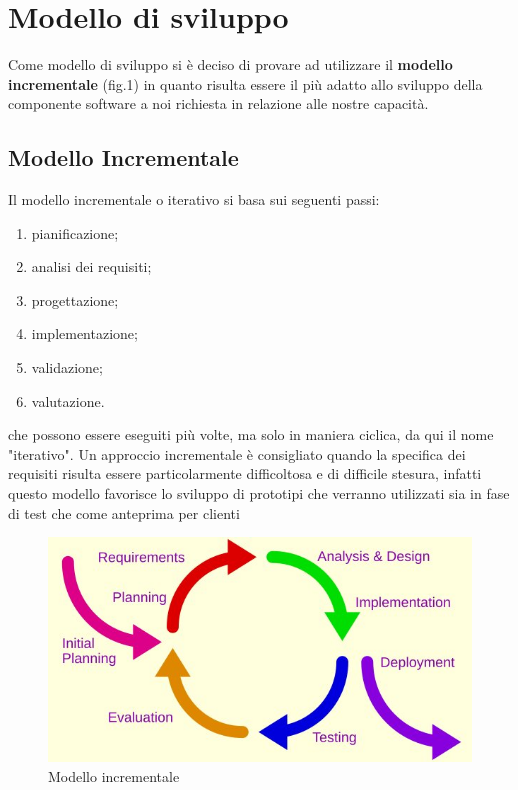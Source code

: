 \section{Modello di sviluppo}
	Come modello di sviluppo si è deciso di provare ad utilizzare il \textbf{modello incrementale} (fig.1) in quanto risulta essere il più adatto allo sviluppo della componente software a noi richiesta in relazione alle nostre capacità. 
	
	\subsection{Modello Incrementale}
		Il modello incrementale o iterativo si basa sui seguenti passi:
		\begin{enumerate}
			\item pianificazione;
			\item analisi dei requisiti;
			\item progettazione;
			\item implementazione;
			\item validazione;
			\item valutazione.
		\end{enumerate}
		che possono essere eseguiti più volte, ma solo in maniera ciclica, da qui il nome "iterativo". Un approccio incrementale è consigliato quando la specifica dei requisiti risulta essere particolarmente difficoltosa e di difficile stesura, infatti questo modello favorisce lo sviluppo di prototipi che verranno utilizzati sia in fase di test che come anteprima per clienti

		\begin{figure}[!htpb]
			\centering
		    \includegraphics{Iterative_development_model.jpg}
			\caption{Modello incrementale}
		\end{figure}